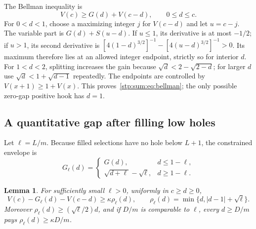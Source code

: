 \documentclass[11pt]{article}
\newtheorem{lemma}[theorem]{Lemma}
\theoremstyle{remark}\newtheorem{remark}[theorem]{Remark}
\begin{document}
The Bellman inequality is
\begin{equation}\label{stp:sum:eq:bellman}
 V(c)\ge G(d)+V(c-d),\qquad 0\le d\le c.
\end{equation}
For $0<d<1$, choose a maximizing integer $j$ for $V(c-d)$ and let $u=c-j$. The variable part is $G(d)+S(u-d)$. If $u\le1$, its derivative is at most $-1/2$; if $u>1$, its second derivative is
$[4(1-d)^{3/2}]^{-1}-[4(u-d)^{3/2}]^{-1}>0$.
Its maximum therefore lies at an allowed integer endpoint, strictly so for interior $d$. For $1<d<2$, splitting increases the gain because
$\sqrt d<2-\sqrt{2-d}$; for larger $d$ use $\sqrt d<1+\sqrt{d-1}$ repeatedly. The endpoints are controlled by $V(x+1)\ge1+V(x)$. This proves~\eqref{stp:sum:eq:bellman}; the only possible zero-gap positive hook has $d=1$.

\subsection{A quantitative gap after filling low holes}
Let $\ell=L/m$. Because filled selections have no hole below $L+1$, the constrained envelope is
\[
 G_\ell(d)=
 \begin{cases}
 G(d),&d\le1-\ell,\\
 \sqrt{d+\ell}-\sqrt\ell,&d\ge1-\ell.
 \end{cases}
\]
\begin{lemma}\label{stp:sum:lem:gap}
For sufficiently small $\ell>0$, uniformly in $c\ge d\ge0$,
\begin{equation}\label{stp:sum:eq:gap}
 V(c)-G_\ell(d)-V(c-d)\ge\kappa\rho_\ell(d),\qquad
 \rho_\ell(d)=\min\{d,|d-1|+\sqrt\ell\}.
\end{equation}
Moreover $\rho_\ell(d)\ge(\sqrt\ell/2)d$, and if $D/m$ is comparable to $\ell$, every $d\ge D/m$ pays $\rho_\ell(d)\ge\kappa D/m$.
\end{lemma}
\end{document}
